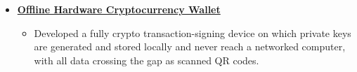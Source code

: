 \documentclass[10pt]{article}
\begin{document}
\begin{itemize}[label={}, leftmargin=0pt, itemsep=5pt]

    \item \textbf{\href{https://www.youtube.com/watch?v=bSHUT5XJSNQ}{Offline Hardware Cryptocurrency
    Wallet}}
    \begin{itemize}
        \item Developed a fully crypto transaction-signing device on which private keys are
        generated and stored locally and never reach a networked computer, with all data crossing the
        gap as scanned QR codes. 
    \end{itemize}



\end{itemize}
\end{document}
